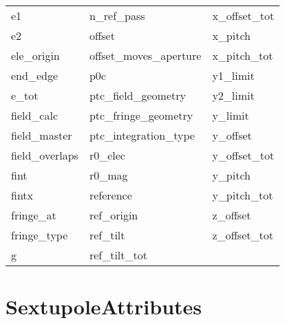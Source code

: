 \begin{tabular}{lll}
e1                          & n_ref_pass                  & x_offset_tot                \\
e2                          & offset                      & x_pitch                     \\
ele_origin                  & offset_moves_aperture       & x_pitch_tot                 \\
end_edge                    & p0c                         & y1_limit                    \\
e_tot                       & ptc_field_geometry          & y2_limit                    \\
field_calc                  & ptc_fringe_geometry         & y_limit                     \\
field_master                & ptc_integration_type        & y_offset                    \\
field_overlaps              & r0_elec                     & y_offset_tot                \\
fint                        & r0_mag                      & y_pitch                     \\
fintx                       & reference                   & y_pitch_tot                 \\
fringe_at                   & ref_origin                  & z_offset                    \\
fringe_type                 & ref_tilt                    & z_offset_tot                \\
g                           & ref_tilt_tot                &                             \\
 \bottomrule
 \end{tabular}
 \vfill
 
 \section{SextupoleAttributes}
 \label{s:list.sextupole}
 
